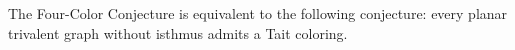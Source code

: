 The Four-Color Conjecture is equivalent to the following conjecture: every planar trivalent graph without isthmus admits a Tait coloring.
